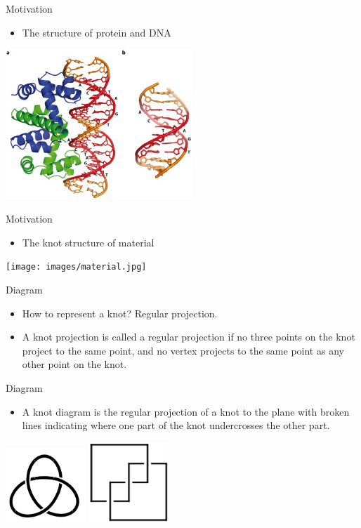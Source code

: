 \begin{frame}{Motivation}
	\begin{itemize}
		\item The structure of protein and DNA
	\end{itemize}
	\centering
	\includegraphics[width=7cm]{images/DNA.png}
\end{frame}

\begin{frame}{Motivation}
	\begin{itemize}
		\item The knot structure of material
	\end{itemize}
	\centering
	\texttt{[image: images/material.jpg]}
\end{frame}

\begin{frame}{Diagram}
	\begin{itemize}
		\item How to represent a knot? Regular projection.
	\end{itemize}
	\begin{itemize}
		\item A knot projection is called a regular projection if no three points on the knot project to the same point, and no vertex
		projects to the same point as any other point on the knot.
	\end{itemize}
\end{frame}

\begin{frame}{Diagram}
	
	\begin{itemize}
		\item A knot diagram is the regular projection of a knot to the plane with broken
		lines indicating where one part of the knot undercrosses the other part.
	\end{itemize}
	\centering
	\includegraphics[width=3cm]{images/trefoil.png}
	\includegraphics[width=3cm]{images/31.png}
\end{frame}

